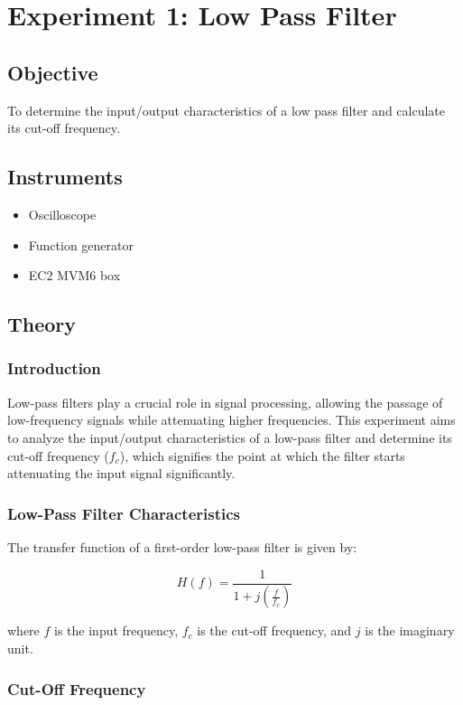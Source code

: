 \newpage
\section{Experiment 1: Low Pass Filter}

\subsection{Objective}
To determine the input/output characteristics of a low pass filter and calculate its cut-off frequency.

\subsection{Instruments}
\begin{itemize}
\item Oscilloscope
\item Function generator
\item EC2 MVM6 box
\end{itemize}

\subsection{Theory}
\subsubsection*{Introduction}

Low-pass filters play a crucial role in signal processing, allowing the passage of low-frequency signals while attenuating higher frequencies. This experiment aims to analyze the input/output characteristics of a low-pass filter and determine its cut-off frequency (\(f_c\)), which signifies the point at which the filter starts attenuating the input signal significantly.

\subsubsection*{Low-Pass Filter Characteristics}

The transfer function of a first-order low-pass filter is given by:

\[
H(f) = \frac{1}{1 + j\left(\frac{f}{f_c}\right)}
\]

where \(f\) is the input frequency, \(f_c\) is the cut-off frequency, and \(j\) is the imaginary unit.

\subsubsection*{Cut-Off Frequency}

